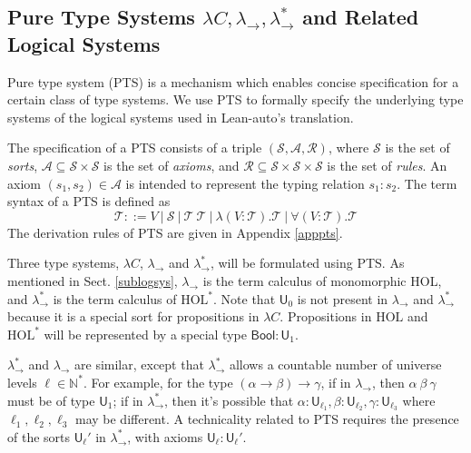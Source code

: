 \subsection{Pure Type Systems $\lambda C, \lambda_\to, \lambda_\to^*$ and Related Logical Systems}\label{sectpts}

  Pure type system (PTS) \cite{LambdaWithType} is a mechanism which enables concise specification
  for a certain class of type systems. We use PTS to formally specify the underlying type systems
  of the logical systems used in Lean-auto's translation.

  The specification of a PTS consists of a triple $(\mathcal{S}, \mathcal{A}, \mathcal{R})$,
  where $\mathcal{S}$ is the set of \textit{sorts}, $\mathcal{A} \subseteq \mathcal{S} \times \mathcal{S}$ is
  the set of \textit{axioms}, and $\mathcal{R} \subseteq \mathcal{S} \times \mathcal{S} \times \mathcal{S}$
  is the set of \textit{rules}. An axiom $(s_1, s_2) \in \mathcal{A}$ is intended to represent
  the typing relation $s_1 : s_2$. The term syntax of a PTS is defined as
  $$\mathcal{T} ::= V \ | \ \mathcal{S} \ | \ \mathcal{T} \ \mathcal{T} \ |
    \ \lambda (V : \mathcal{T}). \mathcal{T} \ | \ \forall (V : \mathcal{T}). \mathcal{T}$$
  \noindent The derivation rules of PTS are given in Appendix \ref{apppts}.

  Three type systems, $\lambda C$, $\lambda_\to$ and $\lambda_\to^*$, will be formulated
  using PTS. As mentioned in Sect. \ref{sublogsys}, $\lambda_\to$
  is the term calculus of monomorphic HOL, and $\lambda_\to^*$ is the term
  calculus of $\text{HOL}^*$. Note that $\mathsf{U}_0$ is not present in $\lambda_\to$ and $\lambda_\to^*$
  because it is a special sort for propositions in $\lambda C$.
  Propositions in $\text{HOL}$ and $\text{HOL}^*$ will be represented by
  a special type $\mathsf{Bool} : \mathsf{U}_1$.
  
  $\lambda_\to^*$ and $\lambda_\to$ are similar, except that $\lambda_\to^*$ allows a
  countable number of universe levels $\ell \in \mathbb{N}^*$. For example,
  for the type $(\alpha \to \beta) \to \gamma$, if in $\lambda_\to$,
  then $\alpha \ \beta \ \gamma$ must be of type $\mathsf{U}_1$; if in
  $\lambda_\to^*$, then it's possible that $\alpha : \mathsf{U}_{\ell_1},
  \beta : \mathsf{U}_{\ell_2}, \gamma : \mathsf{U}_{\ell_3}$ where $\ell_1, \ell_2, \ell_3$
  may be different. A technicality related to PTS requires the presence of
  the sorts $\mathsf{U}_\ell'$ in $\lambda_\to^*$, with axioms $\mathsf{U}_\ell : \mathsf{U}_\ell'$.

